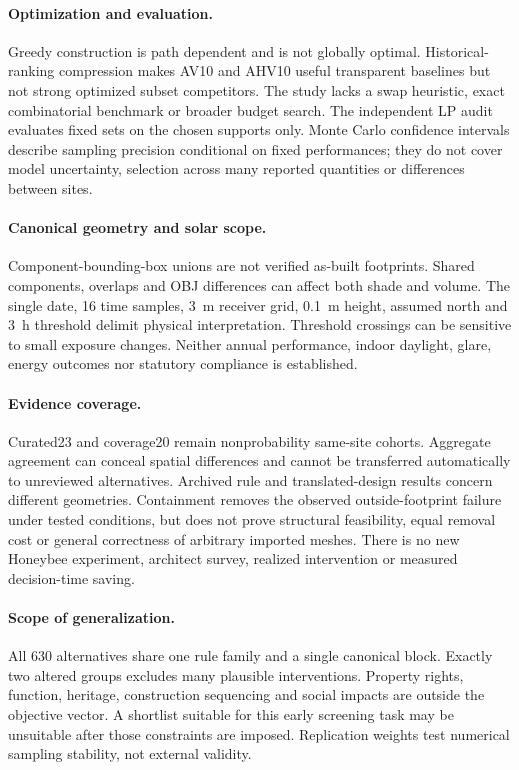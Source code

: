 \documentclass{llncs}
\begin{document}
\paragraph{Optimization and evaluation.} Greedy construction is path dependent and is not globally optimal. Historical-ranking compression makes AV10 and AHV10 useful transparent baselines but not strong optimized subset competitors. The study lacks a swap heuristic, exact combinatorial benchmark or broader budget search. The independent LP audit evaluates fixed sets on the chosen supports only. Monte Carlo confidence intervals describe sampling precision conditional on fixed performances; they do not cover model uncertainty, selection across many reported quantities or differences between sites.

\paragraph{Canonical geometry and solar scope.} Component-bounding-box unions are not verified as-built footprints. Shared components, overlaps and OBJ differences can affect both shade and volume. The single date, 16 time samples, 3~m receiver grid, 0.1~m height, assumed north and 3~h threshold delimit physical interpretation. Threshold crossings can be sensitive to small exposure changes. Neither annual performance, indoor daylight, glare, energy outcomes nor statutory compliance is established.

\paragraph{Evidence coverage.} Curated23 and coverage20 remain nonprobability same-site cohorts. Aggregate agreement can conceal spatial differences and cannot be transferred automatically to unreviewed alternatives. Archived rule and translated-design results concern different geometries. Containment removes the observed outside-footprint failure under tested conditions, but does not prove structural feasibility, equal removal cost or general correctness of arbitrary imported meshes. There is no new Honeybee experiment, architect survey, realized intervention or measured decision-time saving.

\paragraph{Scope of generalization.} All 630 alternatives share one rule family and a single canonical block. Exactly two altered groups excludes many plausible interventions. Property rights, function, heritage, construction sequencing and social impacts are outside the objective vector. A shortlist suitable for this early screening task may be unsuitable after those constraints are imposed. Replication weights test numerical sampling stability, not external validity.
\end{document}
